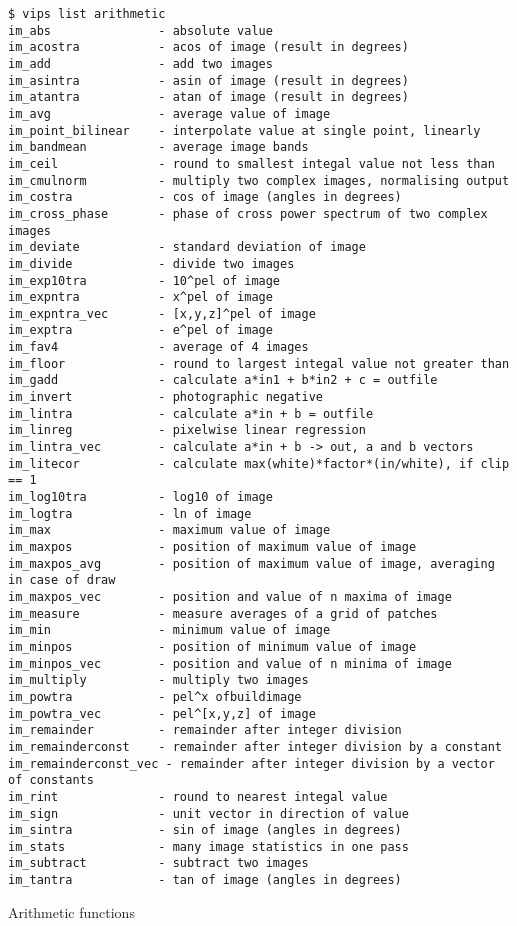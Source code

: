 \begin{fig2}
\begin{verbatim}
$ vips list arithmetic
im_abs               - absolute value
im_acostra           - acos of image (result in degrees)
im_add               - add two images
im_asintra           - asin of image (result in degrees)
im_atantra           - atan of image (result in degrees)
im_avg               - average value of image
im_point_bilinear    - interpolate value at single point, linearly
im_bandmean          - average image bands
im_ceil              - round to smallest integal value not less than
im_cmulnorm          - multiply two complex images, normalising output
im_costra            - cos of image (angles in degrees)
im_cross_phase       - phase of cross power spectrum of two complex images
im_deviate           - standard deviation of image
im_divide            - divide two images
im_exp10tra          - 10^pel of image
im_expntra           - x^pel of image
im_expntra_vec       - [x,y,z]^pel of image
im_exptra            - e^pel of image
im_fav4              - average of 4 images
im_floor             - round to largest integal value not greater than
im_gadd              - calculate a*in1 + b*in2 + c = outfile
im_invert            - photographic negative
im_lintra            - calculate a*in + b = outfile
im_linreg            - pixelwise linear regression
im_lintra_vec        - calculate a*in + b -> out, a and b vectors
im_litecor           - calculate max(white)*factor*(in/white), if clip == 1
im_log10tra          - log10 of image
im_logtra            - ln of image
im_max               - maximum value of image
im_maxpos            - position of maximum value of image
im_maxpos_avg        - position of maximum value of image, averaging in case of draw
im_maxpos_vec        - position and value of n maxima of image
im_measure           - measure averages of a grid of patches
im_min               - minimum value of image
im_minpos            - position of minimum value of image
im_minpos_vec        - position and value of n minima of image
im_multiply          - multiply two images
im_powtra            - pel^x ofbuildimage
im_powtra_vec        - pel^[x,y,z] of image
im_remainder         - remainder after integer division
im_remainderconst    - remainder after integer division by a constant
im_remainderconst_vec - remainder after integer division by a vector of constants
im_rint              - round to nearest integal value
im_sign              - unit vector in direction of value
im_sintra            - sin of image (angles in degrees)
im_stats             - many image statistics in one pass
im_subtract          - subtract two images
im_tantra            - tan of image (angles in degrees)
\end{verbatim}
\caption{Arithmetic functions}
\label{fg:arithmetic}
\end{fig2}

